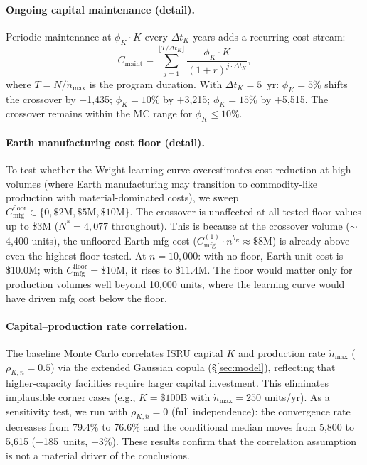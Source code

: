 \paragraph{Ongoing capital maintenance (detail).} Periodic maintenance at $\phi_K \cdot K$ every $\Delta t_K$ years adds a recurring cost stream:
\begin{equation}
  C_{\mathrm{maint}} = \sum_{j=1}^{\lfloor T/\Delta t_K \rfloor} \frac{\phi_K \cdot K}{(1+r)^{j \cdot \Delta t_K}},
\end{equation}
where $T = N/\dot{n}_{\max}$ is the program duration. With $\Delta t_K = 5$~yr: $\phi_K = 5\%$ shifts the crossover by $+$1{,}435; $\phi_K = 10\%$ by $+$3{,}215; $\phi_K = 15\%$ by $+$5{,}515. The crossover remains within the MC range for $\phi_K \leq 10\%$.

\paragraph{Earth manufacturing cost floor (detail).} To test whether the Wright learning curve overestimates cost reduction at high volumes (where Earth manufacturing may transition to commodity-like production with material-dominated costs), we sweep $C_{\mathrm{mfg}}^{\mathrm{floor}} \in \{0, \$2\text{M}, \$5\text{M}, \$10\text{M}\}$. The crossover is unaffected at all tested floor values up to \$3M ($N^* = 4{,}077$ throughout). This is because at the crossover volume ($\sim$4{,}400 units), the unfloored Earth mfg cost ($C_{\mathrm{mfg}}^{(1)} \cdot n^{b_E} \approx \$8$M) is already above even the highest floor tested. At $n = 10{,}000$: with no floor, Earth unit cost is \$10.0M; with $C_{\mathrm{mfg}}^{\mathrm{floor}} = \$10$M, it rises to \$11.4M. The floor would matter only for production volumes well beyond 10{,}000 units, where the learning curve would have driven mfg cost below the floor.

\paragraph{Capital--production rate correlation.} The baseline Monte Carlo correlates ISRU capital $K$ and production rate $\dot{n}_{\max}$ ($\rho_{K,\dot{n}} = 0.5$) via the extended Gaussian copula (\S\ref{sec:model}), reflecting that higher-capacity facilities require larger capital investment. This eliminates implausible corner cases (e.g., $K = \$100$B with $\dot{n}_{\max} = 250$ units/yr). As a sensitivity test, we run with $\rho_{K,\dot{n}} = 0$ (full independence): the convergence rate decreases from 79.4\% to 76.6\% and the conditional median moves from 5{,}800 to 5{,}615 ($-$185~units, $-$3\%). These results confirm that the correlation assumption is not a material driver of the conclusions.

